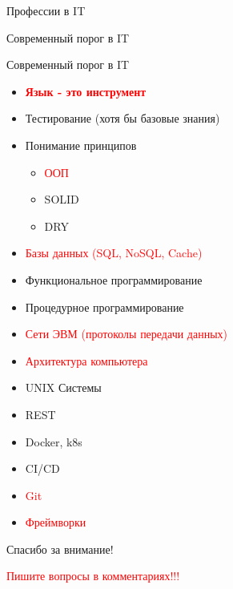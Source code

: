 \documentclass{beamer}
\begin{document}
\begin{section}{Профессии в IT}
\begin{section}{Современный порог в IT}
    \begin{frame}{Современный порог в IT}
        \begin{itemize}
            \item \textcolor{red}{\textbf{Язык - это инструмент}} 
            \item Тестирование (хотя бы базовые знания)
            \item Понимание принципов \begin{itemize}
                \item \textcolor{red}{ООП}
                \item SOLID
                \item DRY
            \end{itemize}
        \end{itemize}
            \begin{itemize}
                \item \textcolor{red}{Базы данных (SQL, NoSQL, Cache)}
                \item Функциональное программирование
                \item Процедурное программирование
                \item \textcolor{red}{Сети ЭВМ (протоколы передачи данных)}
                \item \textcolor{red}{Архитектура компьютера}
                \item UNIX Системы
                \item REST
                \item Docker, k8s
                \item CI/CD
                \item \textcolor{red}{Git}
                \item \textcolor{red}{Фреймворки}
        \end{itemize}
    \end{frame}
\end{section}





\end{section}

\begin{frame}{}
    \centering
    \Large Спасибо за внимание!
    
    \vspace{1cm}
    \small \textcolor{red}{Пишите вопросы в комментариях!!!}
\end{frame}
\end{document}
